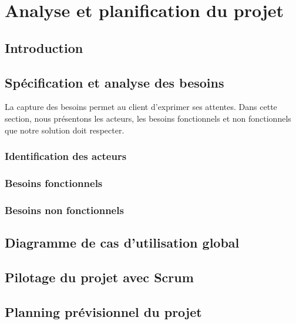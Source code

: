 \chapter{ Analyse et planification du projet}
\renewcommand{\thesection}{\arabic{section}}
\vspace{-0.3cm}
\begin{justify}
    \section*{\texorpdfstring{Introduction}{Introduction}}
        
    \section{Spécification et analyse des besoins}
        \begin{justify}
            La capture des besoins permet au client d’exprimer ses attentes. Dans cette section, nous présentons les acteurs, les besoins fonctionnels et non fonctionnels que notre solution doit respecter. 
        \end{justify}
        \subsection{Identification des acteurs}
         
        \subsection{Besoins fonctionnels}
        
        \subsection{Besoins non fonctionnels}
        
    \section{Diagramme de cas d’utilisation global}
    
    \section{Pilotage du projet avec Scrum}
     
    \section{Planning prévisionnel du projet}
      

\end{justify}
